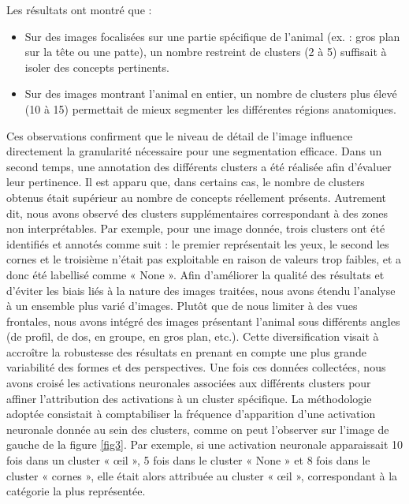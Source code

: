 \documentclass[runningheads]{llncs}
\begin{document}
Les résultats ont montré que :
\begin{itemize}
    \item Sur des images focalisées sur une partie spécifique de l’animal (ex. : gros plan sur la tête ou une patte), un nombre restreint de clusters (2 à 5) suffisait à isoler des concepts pertinents.
    \item Sur des images montrant l’animal en entier, un nombre de clusters plus élevé (10 à 15) permettait de mieux segmenter les différentes régions anatomiques.
\end{itemize}
Ces observations confirment que le niveau de détail de l’image influence directement la granularité nécessaire pour une segmentation efficace.
Dans un second temps, une annotation des différents clusters a été réalisée afin d’évaluer leur pertinence. Il est apparu que, dans certains cas, le nombre de clusters obtenus était supérieur au nombre de concepts réellement présents. Autrement dit, nous avons observé des clusters supplémentaires correspondant à des zones non interprétables. Par exemple, pour une image donnée, trois clusters ont été identifiés et annotés comme suit : le premier représentait les yeux, le second les cornes et le troisième n’était pas exploitable en raison de valeurs trop faibles, et a donc été labellisé comme « None ». Afin d’améliorer la qualité des résultats et d’éviter les biais liés à la nature des images traitées, nous avons étendu l’analyse à un ensemble plus varié d’images. Plutôt que de nous limiter à des vues frontales, nous avons intégré des images présentant l’animal sous différents angles (de profil, de dos, en groupe, en gros plan, etc.). Cette diversification visait à accroître la robustesse des résultats en prenant en compte une plus grande variabilité des formes et des perspectives. Une fois ces données collectées, nous avons croisé les activations neuronales associées aux différents clusters pour affiner l’attribution des activations à un cluster spécifique. La méthodologie adoptée consistait à comptabiliser la fréquence d’apparition d’une activation neuronale donnée au sein des clusters, comme on peut l’observer sur l’image de gauche de la figure \ref{fig3}. Par exemple, si une activation neuronale apparaissait 10 fois dans un cluster « œil », 5 fois dans le cluster « None » et 8 fois dans le cluster « cornes », elle était alors attribuée au cluster « œil », correspondant à la catégorie la plus représentée.
\end{document}
